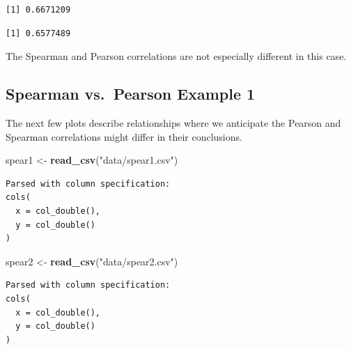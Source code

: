 \documentclass[
]{book}
\newenvironment{Shaded}{\begin{snugshade}}{\end{snugshade}}
\newcommand{\DataTypeTok}[1]{\textcolor[rgb]{0.13,0.29,0.53}{#1}}
\newcommand{\KeywordTok}[1]{\textcolor[rgb]{0.13,0.29,0.53}{\textbf{#1}}}
\newcommand{\NormalTok}[1]{#1}
\newcommand{\OperatorTok}[1]{\textcolor[rgb]{0.81,0.36,0.00}{\textbf{#1}}}
\newcommand{\StringTok}[1]{\textcolor[rgb]{0.31,0.60,0.02}{#1}}
\begin{document}
\begin{verbatim}
[1] 0.6671209
\end{verbatim}

\begin{Shaded}
\end{Shaded}

\begin{verbatim}
[1] 0.6577489
\end{verbatim}

The Spearman and Pearson correlations are not especially different in this case.

\hypertarget{spearman-vs.-pearson-example-1}{%
\subsection{Spearman vs.~Pearson Example 1}\label{spearman-vs.-pearson-example-1}}

The next few plots describe relationships where we anticipate the Pearson and Spearman correlations might differ in their conclusions.

\begin{Shaded}
\begin{Highlighting}[]
\NormalTok{spear1 <-}\StringTok{ }\KeywordTok{read_csv}\NormalTok{(}\StringTok{"data/spear1.csv"}\NormalTok{)}
\end{Highlighting}
\end{Shaded}

\begin{verbatim}
Parsed with column specification:
cols(
  x = col_double(),
  y = col_double()
)
\end{verbatim}

\begin{Shaded}
\begin{Highlighting}[]
\NormalTok{spear2 <-}\StringTok{ }\KeywordTok{read_csv}\NormalTok{(}\StringTok{"data/spear2.csv"}\NormalTok{)}
\end{Highlighting}
\end{Shaded}

\begin{verbatim}
Parsed with column specification:
cols(
  x = col_double(),
  y = col_double()
)
\end{verbatim}
\end{document}
